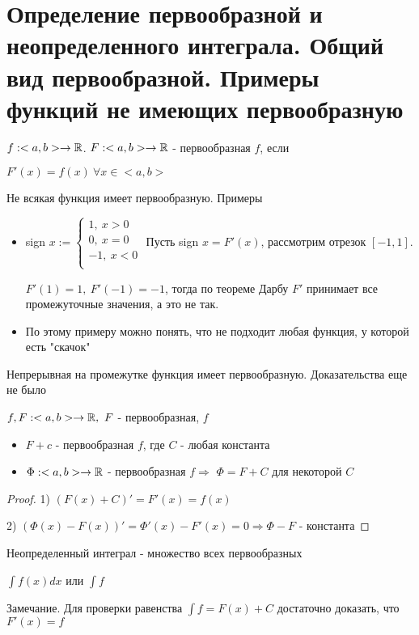 \section{Определение первообразной и неопределенного интеграла. Общий вид первообразной. Примеры функций не имеющих первообразную \href{https://youtu.be/p9C57KDo1Yg?t=3244}{\Walley}}

\begin{conj}
    $f: <a, b> \to \mathbb{R}$. $F:<a, b> \to \mathbb{R}$ - первообразная $f$, если

    $F'(x) = f(x)\ \forall x\in <a, b>$
\end{conj}

Не всякая функция имеет первообразную. Примеры
\begin{itemize}
    \item sign $x:= \begin{cases}
        1,\ x > 0\\
        0,\ x = 0\\
        -1,\ x < 0\\
    \end{cases}$
    Пусть sign $x = F'(x)$, рассмотрим отрезок $[-1, 1]$.

    $F'(1) = 1,\ F'(-1) = -1$, тогда по теореме Дарбу $F'$ принимает все промежуточные значения, а это не так.

    \item По этому примеру можно понять, что не подходит любая функция, у которой есть "скачок"
\end{itemize}

\begin{theorem}
    Непрерывная на промежутке функция имеет первообразную. Доказательства еще не было
\end{theorem}

\begin{theorem}
    $f, F: <a, b> \to \mathbb{R},\ F$ - первообразная, $f$
    \begin{itemize}
        \item $F + c$ - первообразная $f$, где $C$ - любая константа
        \item $\Phi: <a, b> \to \mathbb{R}$ - первообразная $f \Rightarrow$ $\Phi = F+C$ для некоторой $C$
    \end{itemize}
\end{theorem}

\begin{proof}
    1) $(F(x)+C)' = F'(x) = f(x)$
    
    2) $(\Phi(x)-F(x))' = \Phi'(x) - F'(x) = 0 \Rightarrow \Phi - F$ - константа
\end{proof}

\begin{conj}
    Неопределенный интеграл - множество всех первообразных

    $\int f(x) dx$ или $\int f$
\end{conj}

Замечание. Для проверки равенства $\int f = F(x) + C$ достаточно доказать, что $F'(x) = f$
